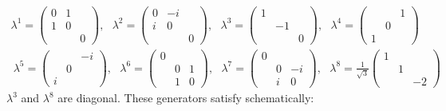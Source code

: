 \begin{equation}
\begin{split}
\lambda ^1 =\begin{pmatrix} 0& 1 &\\ 1& 0 &\\ & & 0 \end{pmatrix},\:\:\: \lambda ^2 =\begin{pmatrix} 0& -i &\\ i& 0 &\\ & & 0 \end{pmatrix}, 
\:\:\: \lambda ^3 =\begin{pmatrix} 1&  &\\ & -1 &\\ & & 0 \end{pmatrix}, \:\:\: \lambda ^4 =\begin{pmatrix} &  &1\\ & 0&\\1 & &  \end{pmatrix}\\\
\lambda ^5 =\begin{pmatrix} &  &-i\\ & 0 &\\ i& &  \end{pmatrix},\:\:\: \lambda ^6 =\begin{pmatrix} 0&  &\\ & 0 &1\\ & 1& 0 \end{pmatrix}, 
\:\:\: \lambda ^7 =\begin{pmatrix} 0&  &\\ & 0 &-i\\ & i& 0 \end{pmatrix}, \:\:\: \lambda ^8 =\frac{1}{\sqrt3}\begin{pmatrix} 1&  &\\ & 1&\\ & &-2  \end{pmatrix}
\end{split}
\end{equation}
\newpage
$ {\lambda}^3 $ and $  {\lambda}^8 $ are diagonal. These generators satisfy schematically:\\ 
